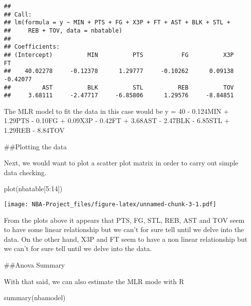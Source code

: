 \documentclass[
]{article}
\newenvironment{Shaded}{\begin{snugshade}}{\end{snugshade}}
\newcommand{\DecValTok}[1]{\textcolor[rgb]{0.00,0.00,0.81}{#1}}
\newcommand{\FunctionTok}[1]{\textcolor[rgb]{0.00,0.00,0.00}{#1}}
\newcommand{\NormalTok}[1]{#1}
\newcommand{\SpecialCharTok}[1]{\textcolor[rgb]{0.00,0.00,0.00}{#1}}
\begin{document}
\begin{verbatim}
## 
## Call:
## lm(formula = y ~ MIN + PTS + FG + X3P + FT + AST + BLK + STL + 
##     REB + TOV, data = nbatable)
## 
## Coefficients:
## (Intercept)          MIN          PTS           FG          X3P           FT  
##    40.02278     -0.12378      1.29777     -0.10262      0.09138     -0.42077  
##         AST          BLK          STL          REB          TOV  
##     3.68111     -2.47717     -6.85806      1.29576     -8.84851
\end{verbatim}

The MLR model to fit the data in this case would be y = 40 - 0.124MIN +
1.29PTS - 0.10FG + 0.09X3P - 0.42FT + 3.68AST - 2.47BLK - 6.85STL +
1.29REB - 8.84TOV

\#\#Plotting the data

Next, we would want to plot a scatter plot matrix in order to carry out
simple data checking.

\begin{Shaded}
\begin{Highlighting}[]
\FunctionTok{plot}\NormalTok{(nbatable[}\DecValTok{5}\SpecialCharTok{:}\DecValTok{14}\NormalTok{])}
\end{Highlighting}
\end{Shaded}

\texttt{[image: NBA-Project\_files/figure-latex/unnamed-chunk-3-1.pdf]}

From the plots above it appears that PTS, FG, STL, REB, AST and TOV seem
to have some linear relationship but we can't for sure tell until we
delve into the data. On the other hand, X3P and FT seem to have a non
linear relationship but we can't for sure tell until we delve into the
data.

\#\#Anova Summary

With that said, we can also estimate the MLR mode with R

\begin{Shaded}
\begin{Highlighting}[]
\FunctionTok{summary}\NormalTok{(nbamodel)}
\end{Highlighting}
\end{Shaded}
\end{document}
